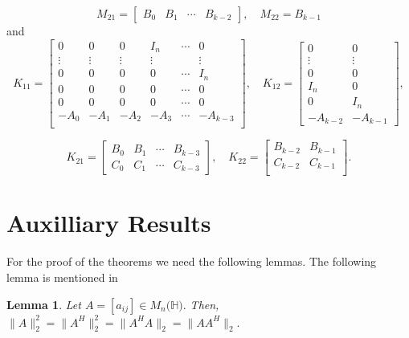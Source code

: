 \documentclass [12pt]{article}
\newtheorem{lemma}[theorem]{Lemma}
\begin{document}
\[
M_{21} = 
\begin{bmatrix}
B_0 & B_1 & \cdots & B_{k-2}
\end{bmatrix}, \quad M_{22} = B_{k-1}
\] and
\[
K_{11} = 
\begin{bmatrix}
0 & 0 & 0& I_n & \cdots & 0 \\
\vdots & \vdots& \vdots  & \vdots &  &\vdots\\
0 & 0 & 0 & 0&\cdots & I_n \\
0 & 0 & 0 & 0&\cdots & 0 \\
0 & 0 & 0 & 0&\cdots & 0 \\
-A_0 & -A_1 & -A_2 & -A_{3}&\cdots & -A_{k-3} \\
\end{bmatrix}, \quad K_{12} = 
\begin{bmatrix}
0 & 0\\
\vdots& \vdots \\
0&0\\
I_{n}&0\\
0&I_{n}\\
-A_{k-2}&-A_{k-1}

\end{bmatrix},
\]

\[
K_{21} = 
\begin{bmatrix}
B_0 & B_1 & \cdots & B_{k-3}\\
C_0 & C_1 & \cdots & C_{k-3}
\end{bmatrix},  \quad K_{22} = 
\begin{bmatrix}
B_{k-2}&B_{k-1} \\
C_{k-2}&C_{k-1}\\ 
\end{bmatrix}.
\]

\section{Auxilliary Results}
\noindent For the proof of the theorems we need the following lemmas. The following lemma is mentioned in \cite{ASSA}
\begin{lemma}{\label{lemma 3.1}}
    Let $A= [a_{ij}]\in M_{n}(\mathbb{H)}.$ Then,  $\|A\|^2_{2}=\|A^{H}\|^{2}_{2}=\|A^{H}A\|_{2}=\|AA^{H}\|_{2}.$
\end{lemma}
\end{document}

